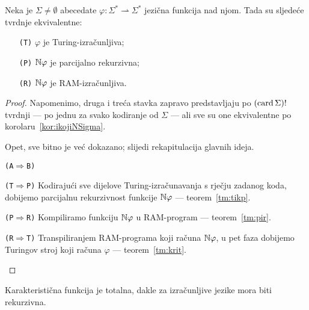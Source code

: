 \begin{teorem}
Neka je $\Sigma\ne\emptyset$ abeceda\newline te $\varphi:\Sigma^*\rightharpoonup\Sigma^*$ jezična funkcija nad njom. Tada su sljedeće tvrdnje ekvivalentne:
\begin{itemize}
    \item[\texttt{\textup{(T)}}] $\varphi$ je Turing-izračunljiva;
    \item[\texttt{\textup{(P)}}] ${\mathbb N}\varphi$ je parcijalno rekurzivna;
    \item[\texttt{\textup{(R)}}] ${\mathbb N}\varphi$ je RAM-izračunljiva.
\end{itemize}
\end{teorem}
\begin{proof}
Napomenimo, druga i treća stavka zapravo predstavljaju po $(\operatorname{card}\Sigma)!$ tvrdnji --- po jednu za svako kodiranje od $\Sigma$ --- ali sve su one ekvivalentne po korolaru~\ref{kor:ikojiNSigma}.

Opet, sve bitno je već dokazano; slijedi rekapitulacija glavnih ideja.
\begin{labeling}{\texttt{(A$\Rightarrow$B)}}
\item[\texttt{(T$\Rightarrow$P)}] Kodirajući sve dijelove Turing-izračunavanja s rječju zadanog koda, dobijemo parcijalnu rekurzivnost funkcije ${\mathbb N}\varphi$ --- teorem~\ref{tm:tikp}.
\item[\texttt{(P$\Rightarrow$R)}] Kompiliramo funkciju ${\mathbb N}\varphi$ u RAM-program --- teorem~\ref{tm:pir}.
\item[\texttt{(R$\Rightarrow$T)}] Transpiliranjem RAM-programa koji računa ${\mathbb N}\varphi$, u pet faza dobijemo Turingov stroj koji računa $\varphi$ --- teorem~\ref{tm:krit}.\qedhere
\end{labeling}
\end{proof}

\noindent Karakteristična funkcija je totalna, dakle za izračunljive jezike mora biti rekurzivna.

